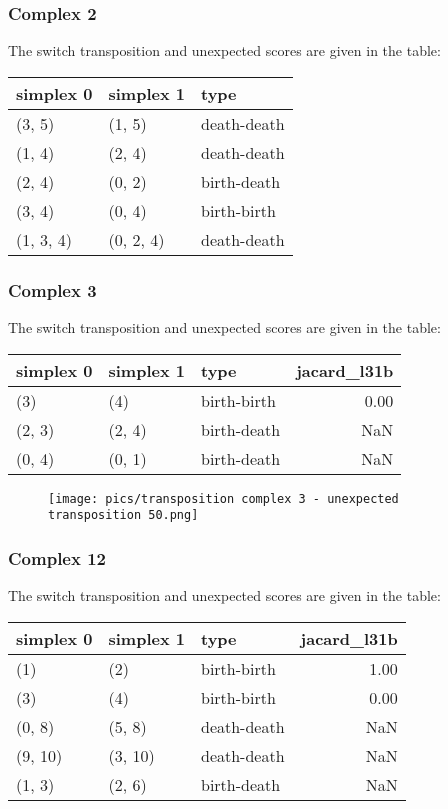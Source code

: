 \documentclass{article}
\begin{document}
\subsubsection{Complex 2}
\par The switch transposition and unexpected scores are given in the table:
\begin{center}
\begin{tabular}{lll}
\toprule
simplex 0 & simplex 1 & type \\
\midrule
(3, 5) & (1, 5) & death-death \\
(1, 4) & (2, 4) & death-death \\
(2, 4) & (0, 2) & birth-death \\
(3, 4) & (0, 4) & birth-birth \\
(1, 3, 4) & (0, 2, 4) & death-death \\
\bottomrule
\end{tabular}
\end{center}


\subsubsection{Complex 3}
\par The switch transposition and unexpected scores are given in the table:
\begin{center}
\begin{tabular}{lllr}
\toprule
simplex 0 & simplex 1 & type & jacard\_l31b \\
\midrule
(3) & (4) & birth-birth & 0.00 \\
(2, 3) & (2, 4) & birth-death & NaN \\
(0, 4) & (0, 1) & birth-death & NaN \\
\bottomrule
\end{tabular}
\end{center}

\begin{figure}[ht]
\centering
\texttt{[image: pics/transposition complex 3 - unexpected transposition 50.png]}
\end{figure}


\subsubsection{Complex 12}
\par The switch transposition and unexpected scores are given in the table:
\begin{center}
\begin{tabular}{lllr}
\toprule
simplex 0 & simplex 1 & type & jacard\_l31b \\
\midrule
(1) & (2) & birth-birth & 1.00 \\
(3) & (4) & birth-birth & 0.00 \\
(0, 8) & (5, 8) & death-death & NaN \\
(9, 10) & (3, 10) & death-death & NaN \\
(1, 3) & (2, 6) & birth-death & NaN \\
\bottomrule
\end{tabular}
\end{center}
\end{document}
